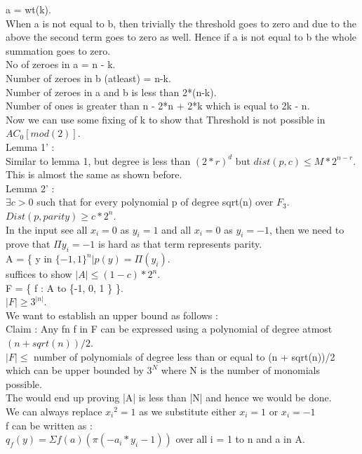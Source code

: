 \documentclass[solution,addpoints,12pt]{exam}
\begin{document}
a = wt(k).\\
When a is not equal to b, then trivially the threshold goes to zero and
due to the above the second term goes to zero as well. Hence if a is not equal
to b the whole summation goes to zero.\\
No of zeroes in a = n - k.\\
Number of zeroes in b (atleast) = n-k.\\
Number of zeroes in a and b is less than 2*(n-k).\\
Number of ones is greater than n - 2*n + 2*k which is equal to  2k - n.\\
Now we can use some fixing of k to show that Threshold is not possible in $AC_0[mod(2)]$.\\

Lemma 1' :\\
Similar to lemma 1, but degree is less than ${(2*r)}^d$ but
$dist(p, c) \le  M*2^{n-r}$.\\

This is almost the same as shown before.\\

Lemma 2' :\\
$\exists c > 0$ such that for every polynomial p of degree sqrt(n) over
$F_3$. $Dist(p, parity) \ge c*2^n$.\\
In the input see all $x_i = 0$ as $y_i = 1$ and all $x_i = 0$ as $y_i = -1$,
then we need to prove that $\Pi y_i = -1$ is hard as that term represents parity.\\
A = \{ y in ${\{ -1, 1 \}}^n | p(y) = \Pi(y_i)$.\\
suffices to show $|A| \le (1-c)*2^n$.\\

F = \{ f : A to \{-1, 0, 1 \} \}.\\
$|F| \ge 3^{|n|}$.\\
We want to establish an upper bound as follows :\\
Claim : Any fn f in F can be expressed using a polynomial of degree atmost
$(n+sqrt(n))/2$.\\
$|F| \le$ number of polynomials of degree less than or equal to (n + sqrt(n))/2
which can be upper bounded by $3^N$ where N is the number of monomials possible.\\
The would end up proving |A| is less than |N| and hence we would be done.\\
We can always replace ${x_i}^2 = 1$ as we substitute either $x_i = 1$ or $x_i = -1$\\
f can be written as :\\
$q_f(y) = \Sigma f(a) (\pi (-a_i*y_i - 1))$ over all i = 1 to n and a in A.\\
\end{document}
